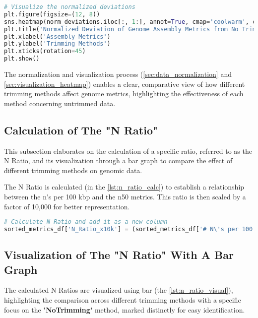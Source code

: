 \begin{lstlisting}[language=Python, label={lst:heatmap}, caption=Heatmap Visualization]
# Visualize the normalized deviations
plt.figure(figsize=(12, 8))
sns.heatmap(norm_deviations.iloc[:, 1:], annot=True, cmap='coolwarm', center=0, yticklabels=norm_deviations['Trimming Parameters'])
plt.title('Normalized Deviation of Genome Assembly Metrics from No Trimming')
plt.xlabel('Assembly Metrics')
plt.ylabel('Trimming Methods')
plt.xticks(rotation=45)
plt.show()
\end{lstlisting}

The normalization and visualization process (\ref{sec:data_normalization} and \ref{sec:visualization_heatmap}) enables a clear, comparative view of how different \gls{trimming} methods affect \gls{genome} \gls{metrics}, highlighting the effectiveness of each method concerning untrimmed data.


\subsection{Calculation of The "N Ratio"}\label{sec:calculation_n_ratio}
This subsection elaborates on the calculation of a specific ratio, referred to as the N Ratio, and its visualization through a \gls{bar} graph to compare the effect of different \gls{trimming} methods on genomic data.

The N Ratio is calculated (in the \autoref{lst:n_ratio_calc}) to establish a relationship between the \gls{n's per 100 kbp} and the \gls{n50} \gls{metrics}. This ratio is then scaled by a factor of 10,000 for better representation.

\begin{lstlisting}[language=Python, label={lst:n_ratio_calc}, caption=Calculating of the "N Ratio"]
# Calculate N Ratio and add it as a new column
sorted_metrics_df['N_Ratio_x10k'] = (sorted_metrics_df['# N\'s per 100 kbp'] / sorted_metrics_df['N50']) * 10000
\end{lstlisting}

\subsection{Visualization of The "N Ratio" With A Bar Graph}\label{sec:visualization_n_ratio}
The calculated N Ratios are visualized using \gls{bar} (the \autoref{lst:n_ratio_visual}), highlighting the comparison across different \gls{trimming} methods with a specific focus on the \textbf{'NoTrimming'} method, marked distinctly for easy identification.

